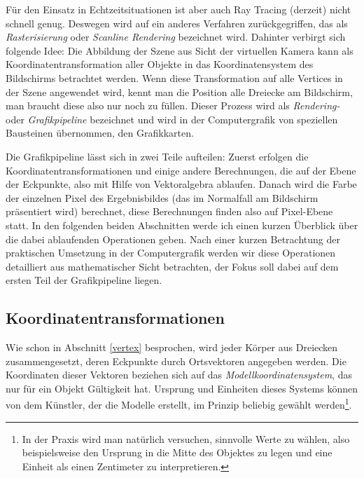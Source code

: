 Für den Einsatz in Echtzeitsituationen ist aber auch Ray Tracing (derzeit) nicht schnell genug. Deswegen wird auf ein anderes Verfahren zurückgegriffen, das als \emph{Rasterisierung} oder \emph{Scanline Rendering} bezeichnet wird. Dahinter verbirgt sich folgende Idee: Die Abbildung der Szene aus Sicht der virtuellen Kamera kann als Koordinatentransformation aller Objekte in das Koordinatensystem des Bildschirms betrachtet werden. Wenn diese Transformation auf alle Vertices in der Szene angewendet wird, kennt man die Position alle Dreiecke am Bildschirm, man braucht diese also nur noch zu füllen. Dieser Prozess wird als \emph{Rendering-} oder \emph{Grafikpipeline} bezeichnet und wird in der Computergrafik von speziellen Bausteinen übernommen, den Grafikkarten.

Die Grafikpipeline lässt sich in zwei Teile aufteilen: Zuerst erfolgen die Koordinatentransformationen und einige andere Berechnungen, die auf der Ebene der Eckpunkte, also mit Hilfe von Vektoralgebra ablaufen. Danach wird die Farbe der einzelnen Pixel des Ergebnisbildes (das im Normalfall am Bildschirm präsentiert wird) berechnet, diese Berechnungen finden also auf Pixel-Ebene statt. In den folgenden beiden Abschnitten werde ich einen kurzen Überblick über die dabei ablaufenden Operationen geben. Nach einer kurzen Betrachtung der praktischen Umsetzung in der Computergrafik werden wir diese Operationen detailliert aus mathematischer Sicht betrachten, der Fokus soll dabei auf dem ersten Teil der Grafikpipeline liegen.



\subsection{Koordinatentransformationen}
Wie schon in Abschnitt \ref{vertex} besprochen, wird jeder Körper aus Dreiecken zusammengesetzt, deren Eckpunkte durch Ortsvektoren angegeben werden. Die Koordinaten dieser Vektoren beziehen sich auf das \emph{Modellkoordinatensystem}, das nur für ein Objekt Gültigkeit hat. Ursprung und Einheiten dieses Systems können von dem Künstler, der die Modelle erstellt, im Prinzip beliebig gewählt werden\footnote{In der Praxis wird man natürlich versuchen, sinnvolle Werte zu wählen, also beispielsweise den Ursprung in die Mitte des Objektes zu legen und eine Einheit als einen Zentimeter zu interpretieren.}.

